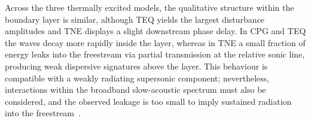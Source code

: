 Across the three thermally excited models, the qualitative structure within the boundary layer is similar, although \gls{TEQ} yields the largest disturbance amplitudes and \gls{TNE} displays a slight downstream phase delay. In \gls{CPG} and \gls{TEQ} the waves decay more rapidly inside the layer, whereas in \gls{TNE} a small fraction of energy leaks into the freestream via partial transmission at the relative sonic line, producing weak dispersive signatures above the layer. This behaviour is compatible with a weakly radiating supersonic component; nevertheless, interactions within the broadband slow-acoustic spectrum must also be considered, and the observed leakage is too small to imply sustained radiation into the freestream~\citep{KniselyZhong2019}.













